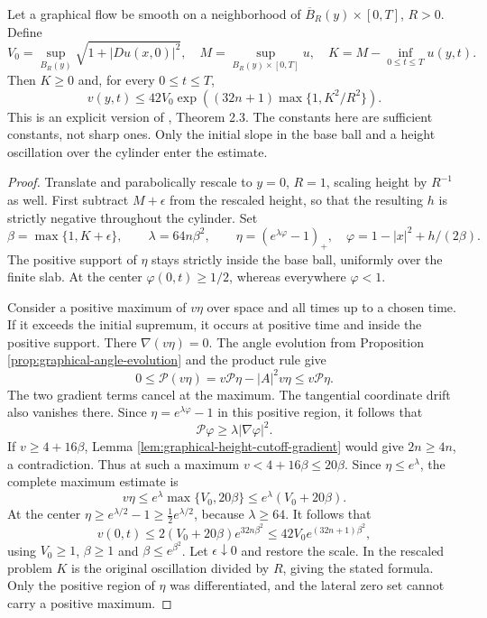 \begin{theorem}\label{thm:graphical-height-gradient-estimate}
Let a graphical flow be smooth on a neighborhood of $\overline B_R(y)\times[0,T]$, $R>0$. Define
\[
 V_0=\sup_{B_R(y)}\sqrt{1+|Du(x,0)|^2},\quad
 M=\sup_{B_R(y)\times[0,T]}u,\quad
 K=M-\inf_{0\leq t\leq T}u(y,t).
\]
Then $K\geq0$ and, for every $0\leq t\leq T$,
\[
 v(y,t)\leq42V_0\exp\left((32n+1)\max\{1,K^2/R^2\}\right).
\]
This is an explicit version of \cite{EH91}, Theorem 2.3. The constants here are sufficient constants, not sharp ones. Only the initial slope in the base ball and a height oscillation over the cylinder enter the estimate.
\end{theorem}
\begin{proof}
Translate and parabolically rescale to $y=0$, $R=1$, scaling height by $R^{-1}$ as well. First subtract $M+\epsilon$ from the rescaled height, so that the resulting $h$ is strictly negative throughout the cylinder. Set
\[
 \beta=\max\{1,K+\epsilon\},\qquad
 \lambda=64n\beta^2,\qquad
 \eta=(e^{\lambda\varphi}-1)_+,
 \quad\varphi=1-|x|^2+h/(2\beta).
\]
The positive support of $\eta$ stays strictly inside the base ball, uniformly over the finite slab. At the center $\varphi(0,t)\geq1/2$, whereas everywhere $\varphi<1$.

Consider a positive maximum of $v\eta$ over space and all times up to a chosen time. If it exceeds the initial supremum, it occurs at positive time and inside the positive support. There $\nabla(v\eta)=0$. The angle evolution from Proposition \ref{prop:graphical-angle-evolution} and the product rule give
\[
 0\leq\mathcal P(v\eta)
      =v\mathcal P\eta-|A|^2v\eta
      \leq v\mathcal P\eta.
\]
The two gradient terms cancel at the maximum. The tangential coordinate drift also vanishes there. Since $\eta=e^{\lambda\varphi}-1$ in this positive region, it follows that
\[
 \mathcal P\varphi\geq\lambda|\nabla\varphi|^2.
\]
If $v\geq4+16\beta$, Lemma \ref{lem:graphical-height-cutoff-gradient} would give $2n\geq4n$, a contradiction. Thus at such a maximum $v<4+16\beta\leq20\beta$. Since $\eta\leq e^\lambda$, the complete maximum estimate is
\[
 v\eta\leq e^\lambda\max\{V_0,20\beta\}
          \leq e^\lambda(V_0+20\beta).
\]
At the center $\eta\geq e^{\lambda/2}-1\geq\tfrac12 e^{\lambda/2}$, because $\lambda\geq64$. It follows that
\[
 v(0,t)\leq2(V_0+20\beta)e^{32n\beta^2}
       \leq42V_0e^{(32n+1)\beta^2},
\]
using $V_0\geq1$, $\beta\geq1$ and $\beta\leq e^{\beta^2}$. Let $\epsilon\downarrow0$ and restore the scale. In the rescaled problem $K$ is the original oscillation divided by $R$, giving the stated formula. Only the positive region of $\eta$ was differentiated, and the lateral zero set cannot carry a positive maximum.
\end{proof}

